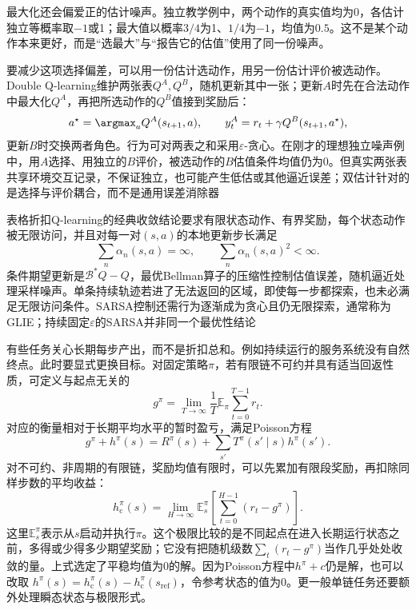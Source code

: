 最大化还会偏爱正的估计噪声。独立教学例中，两个动作的真实值均为0，各估计独立等概率取$-1$或1；最大值以概率$3/4$为1、$1/4$为$-1$，均值为$0.5$。这不是某个动作本来更好，而是“选最大”与“报告它的估值”使用了同一份噪声。

要减少这项选择偏差，可以用一份估计选动作，用另一份估计评价被选动作。Double Q-learning维护两张表$Q^A,Q^B$，随机更新其中一张；更新$A$时先在合法动作中最大化$Q^A$，再把所选动作的$Q^B$值接到奖励后：
\begin{equation}
  a^\star=\argmax_a Q^A(s_{t+1},a),\qquad
  y_t^A=r_t+\gamma Q^B(s_{t+1},a^\star),
  \label{eq:rl-learning-double-q}
\end{equation}
更新$B$时交换两者角色。行为可对两表之和采用$\varepsilon$-贪心。在刚才的理想独立噪声例中，用$A$选择、用独立的$B$评价，被选动作的$B$估值条件均值仍为0。但真实两张表共享环境交互记录，不保证独立，也可能产生低估或其他逼近误差；双估计针对的是选择与评价耦合，而不是通用误差消除器

表格折扣Q-learning的经典收敛结论要求有限状态动作、有界奖励，每个状态动作被无限访问，并且对每一对$(s,a)$的本地更新步长满足
\[
  \sum_n\alpha_n(s,a)=\infty,\qquad
  \sum_n\alpha_n(s,a)^2<\infty .
\]
条件期望更新是$\mathcal B^*Q-Q$，最优Bellman算子的压缩性控制估值误差，随机逼近处理采样噪声。单条持续轨迹若进了无法返回的区域，即使每一步都探索，也未必满足无限访问条件。SARSA控制还需行为逐渐成为贪心且仍无限探索，通常称为GLIE；持续固定$\varepsilon$的SARSA并非同一个最优性结论

有些任务关心长期每步产出，而不是折扣总和。例如持续运行的服务系统没有自然终点。此时要显式更换目标。对固定策略$\pi$，若有限链不可约并具有适当回返性质，可定义与起点无关的
\[
  g^\pi=\lim_{T\to\infty}\frac1T
      \mathbb E_\pi\sum_{t=0}^{T-1}r_t .
\]
对应的衡量相对于长期平均水平的暂时盈亏，满足Poisson方程
\begin{equation}
  g^\pi+h^\pi(s)=R^\pi(s)+\sum_{s'}T^\pi(s'\mid s)h^\pi(s').
  \label{eq:rl-learning-average-poisson}
\end{equation}
对不可约、非周期的有限链，奖励均值有限时，可以先累加有限段奖励，再扣除同样步数的平均收益：
\[
  h_{\mathrm c}^\pi(s)
   =\lim_{H\to\infty}\mathbb E_s^\pi\!\left[
        \sum_{t=0}^{H-1}(r_t-g^\pi)\right].
\]
这里$\mathbb E_s^\pi$表示从$s$启动并执行$\pi$。这个极限比较的是不同起点在进入长期运行状态之前，多得或少得多少期望奖励；它没有把随机级数$\sum_t(r_t-g^\pi)$当作几乎处处收敛的量。上式选定了平稳均值为0的解。因为Poisson方程中$h^\pi+c$仍是解，也可以改取
$h^\pi(s)=h_{\mathrm c}^\pi(s)-h_{\mathrm c}^\pi(s_{\mathrm{ref}})$，令参考状态的值为0。更一般单链任务还要额外处理瞬态状态与极限形式。

